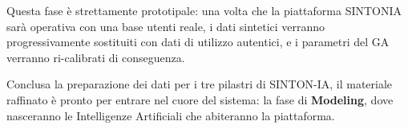Questa fase è strettamente prototipale: una volta che la piattaforma SINTONIA sarà operativa con una base utenti reale, i dati sintetici verranno progressivamente sostituiti con dati di utilizzo autentici, e i parametri del GA verranno ri-calibrati di conseguenza.

Conclusa la preparazione dei dati per i tre pilastri di SINTON-IA, il materiale raffinato è pronto per entrare nel cuore del sistema: la fase di \textbf{Modeling}, dove nasceranno le Intelligenze Artificiali che abiteranno la piattaforma.
